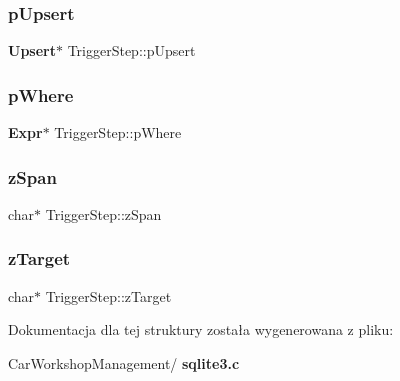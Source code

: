 \mbox{\label{struct_trigger_step_a90e5d9575d8a7b3fae79149c19b22f59}} 
\subsubsection{pUpsert}
{\footnotesize\ttfamily \textbf{ Upsert}$\ast$ Trigger\+Step\+::p\+Upsert}

\mbox{\label{struct_trigger_step_ad4c293b04dfda535f3aad5b9e02726c7}} 
\subsubsection{pWhere}
{\footnotesize\ttfamily \textbf{ Expr}$\ast$ Trigger\+Step\+::p\+Where}

\mbox{\label{struct_trigger_step_aaba313f7968243ed0cb514c2ae5da052}} 
\subsubsection{zSpan}
{\footnotesize\ttfamily char$\ast$ Trigger\+Step\+::z\+Span}

\mbox{\label{struct_trigger_step_a5e48fd22b4e42ca72ae6e505861483df}} 
\subsubsection{zTarget}
{\footnotesize\ttfamily char$\ast$ Trigger\+Step\+::z\+Target}



Dokumentacja dla tej struktury została wygenerowana z pliku\+:\begin{DoxyCompactItemize}
\item 
Car\+Workshop\+Management/\textbf{ sqlite3.\+c}\end{DoxyCompactItemize}
